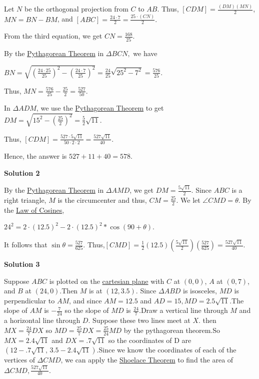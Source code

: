 \begin{enumerate}
 Let $N$ be the orthogonal projection from $C$ to $AB.$ Thus, $[CDM]=\frac{(DM)(MN)} {2}$, $MN=BN-BM$, and $[ABC]=\frac{24 \cdot 7} {2} =\frac{25 \cdot (CN)} {2}.$

 From the third equation, we get $CN=\frac{168} {25}.$

 By the \href{https://artofproblemsolving.com/wiki/index.php?title=Pythagorean\_Theorem}{Pythagorean Theorem} in $\Delta BCN,$ we have 

 $BN=\sqrt{\left(\frac{24 \cdot 25} {25}\right)^2-\left(\frac{24 \cdot 7} {25}\right)^2}=\frac{24} {25}\sqrt{25^2-7^2}=\frac{576} {25}.$ 

 Thus, $MN=\frac{576} {25}-\frac{25} {2}=\frac{527} {50}.$ 

 In $\Delta ADM$, we use the \href{https://artofproblemsolving.com/wiki/index.php?title=Pythagorean\_Theorem}{Pythagorean Theorem} to get $DM=\sqrt{15^2-\left(\frac{25} {2}\right)^2}=\frac{5} {2} \sqrt{11}.$

 Thus, $[CDM]=\frac{527 \cdot 5\sqrt{11}} {50 \cdot 2 \cdot 2}= \frac{527\sqrt{11}} {40}.$

 Hence, the answer is $527+11+40=\boxed{578}.$




\textbf{Solution 2}

By the \href{https://artofproblemsolving.com/wiki/index.php?title=Pythagorean\_Theorem}{Pythagorean Theorem} in $\Delta AMD$, we get $DM=\frac{5\sqrt{11}} {2}$. Since $ABC$ is a right triangle, $M$ is the circumcenter and thus, $CM=\frac{25} {2}$. We let $\angle CMD=\theta$. By the \href{https://artofproblemsolving.com/wiki/index.php?title=Law\_of\_Cosines}{Law of Cosines},

 $24^2 = 2 \cdot (12.5)^2-2 \cdot (12.5)^2 * \cos (90+\theta).$

 It follows that $\sin \theta = \frac{527} {625}$. Thus,$[CMD]=\frac{1} {2} (12.5) \left(\frac{5\sqrt{11}} {2}\right)\left(\frac{527} {625}\right)=\frac{527\sqrt{11}} {40}$.

 



\textbf{Solution 3}

Suppose $ABC$ is plotted on the \href{https://artofproblemsolving.com/wiki/index.php?title=Cartesian\_plane}{cartesian plane} with $C$ at $(0,0)$, $A$ at $(0,7)$, and $B$ at $(24,0)$.Then $M$ is at $(12,3.5)$. Since $\Delta ABD$ is isosceles, $MD$ is perpendicular to $AM$, and since $AM=12.5$ and $AD=15, MD=2.5\sqrt{11}$.The slope of $AM$ is $-\frac{7}{24}$ so the slope of $MD$ is $\frac{24}{7}$.Draw a vertical line through $M$ and a horizontal line through $D$. Suppose these two lines meet at $X$. then $MX=\frac{24}{7}DX$ so $MD=\frac{25}{7}DX=\frac{25}{24}MD$ by the pythagorean theorem.So $MX=2.4\sqrt{11}$ and $DX=.7\sqrt{11}$ so the coordinates of D are $(12-.7\sqrt{11},\, 3.5-2.4\sqrt{11})$.Since we know the coordinates of each of the vertices of $\Delta CMD$, we can apply the \href{https://artofproblemsolving.com/wiki/index.php?title=Shoelace\_Theorem}{Shoelace Theorem} to find the area of $\Delta CMD, \frac{527 \sqrt{11}}{40}$.


\end{enumerate}
